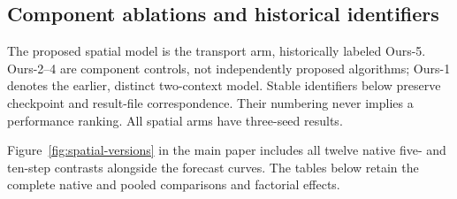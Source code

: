 \subsection{Component ablations and historical identifiers}
The proposed spatial model is the transport arm, historically labeled Ours-5.
Ours-2--4 are component controls, not independently proposed algorithms;
Ours-1 denotes the earlier, distinct two-context model. Stable identifiers
below preserve checkpoint and result-file correspondence. Their numbering
never implies a performance ranking. All spatial arms have three-seed results.

Figure~\ref{fig:spatial-versions} in the main paper includes all twelve native
five- and ten-step contrasts alongside the forecast curves. The tables below
retain the complete native and pooled comparisons and factorial effects.


